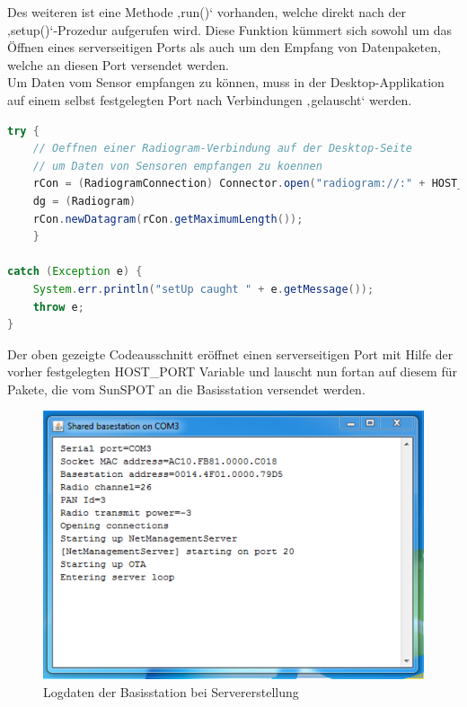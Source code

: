 Des weiteren ist eine Methode ‚run()‘ vorhanden, welche direkt nach der ‚setup()‘-Prozedur aufgerufen wird. Diese Funktion kümmert sich sowohl um das Öffnen eines serverseitigen Ports als auch um den Empfang von Datenpaketen, welche an diesen Port versendet werden. \\
Um Daten vom Sensor empfangen zu können, muss in der Desktop-Applikation auf einem selbst festgelegten Port nach Verbindungen ‚gelauscht‘ werden. 
\\
\begin{lstlisting}[language=Java,caption={Öffnen des serverseitigen Ports},label=lst:portserver,frame=single] 
try {
	// Oeffnen einer Radiogram-Verbindung auf der Desktop-Seite
	// um Daten von Sensoren empfangen zu koennen
	rCon = (RadiogramConnection) Connector.open("radiogram://:" + HOST_PORT);
	dg = (Radiogram)
	rCon.newDatagram(rCon.getMaximumLength());
	} 
	
catch (Exception e) {
	System.err.println("setUp caught " + e.getMessage());
	throw e;
}
\end{lstlisting}

Der oben gezeigte Codeausschnitt eröffnet einen serverseitigen Port mit Hilfe der vorher festgelegten HOST\_PORT Variable und lauscht nun fortan auf diesem für Pakete, die vom SunSPOT an die Basisstation versendet werden.\\

\begin{figure}[H] 
	\centering
	\includegraphics[scale=0.5]{Bilder/server}
	\caption{Logdaten der Basisstation bei Servererstellung}
	\label{f:server}
\end{figure}

